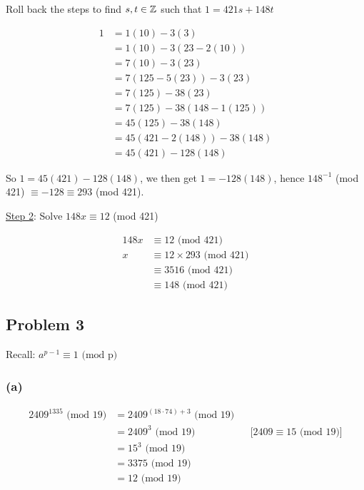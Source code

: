 \documentclass[10pt]{article}
\begin{document}
\spacing
\noindent
Roll back the steps to find $s, t \in \mathbb{Z}$ such that $1 = 421s + 148t$

\begin{align*}
  1 &= 1(10) - 3(3) \\
    &= 1(10) - 3(23 - 2(10)) \\
    &= 7(10) - 3(23) \\
    &= 7(125 - 5(23)) - 3(23) \\
    &= 7(125) - 38(23) \\
    &= 7(125) - 38(148 - 1(125)) \\
    &= 45(125) - 38(148) \\
    &= 45(421 - 2(148)) - 38(148) \\
    &= 45(421) - 128(148)
\end{align*}

\spacing
\noindent
So $1 = 45(421) - 128(148)$, we then get $1 = -128(148)$, 
hence $148^{-1}$ (mod 421) $\equiv -128 \equiv 293$ (mod 421).
\spacing

\noindent
\underline{Step 2}: Solve $148x \equiv 12$ (mod 421)

\begin{align*}
  148x &\equiv 12 \text{ (mod 421)} \\
     x &\equiv 12 \times 293 \text{ (mod 421)} \\
       &\equiv 3516 \text{ (mod 421)} \\
       &\equiv 148 \text{ (mod 421)}
\end{align*}

\newpage
\subsection*{Problem 3}

Recall: $a^{p - 1} \equiv 1 \text{ (mod p)}$

\subsubsection*{(a)}

\begin{align*}
  2409^{1335} \text{ (mod 19)} &= 2409^{(18 \cdot 74) + 3} \text{ (mod 19)} \\
    &= 2409^3 \text{ (mod 19)} && \text{[$2409 \equiv 15$ (mod 19)]} \\
    &= 15^3 \text{ (mod 19)} \\
    &= 3375 \text{ (mod 19)} \\
    &= 12 \text{ (mod 19)}
\end{align*}
\end{document}
